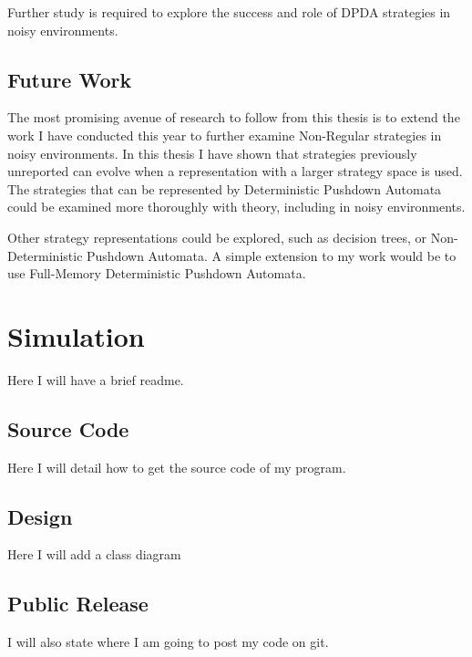 \documentclass[a4paper,11pt,bcshonoursthesis,singlespace,oneside,thesisdraft,pdflatex]{cssethesis}
\begin{document}
Further study is required to explore the success and role of DPDA strategies in noisy environments. 
\section{Future Work}
The most promising avenue of research to follow from this thesis is to extend the work I have conducted this year to further examine Non-Regular strategies in noisy environments. 
In this thesis I have shown that strategies previously unreported can evolve when a representation with a larger strategy space is used. 
The strategies that can be represented by Deterministic Pushdown Automata could be examined more thoroughly with theory, including in noisy environments. 

Other strategy representations could be explored, such as decision trees, or Non-Deterministic Pushdown Automata. 
A simple extension to my work would be to use Full-Memory Deterministic Pushdown Automata.
\appendix %

\chapter{Simulation}
Here I will have a brief readme.
\section{Source Code}
\label{app:code}
Here I will detail how to get the source code of my program. 
\section{Design}
Here I will add a class diagram
\section{Public Release}
I will also state where I am going to post my code on git.


\end{document}
